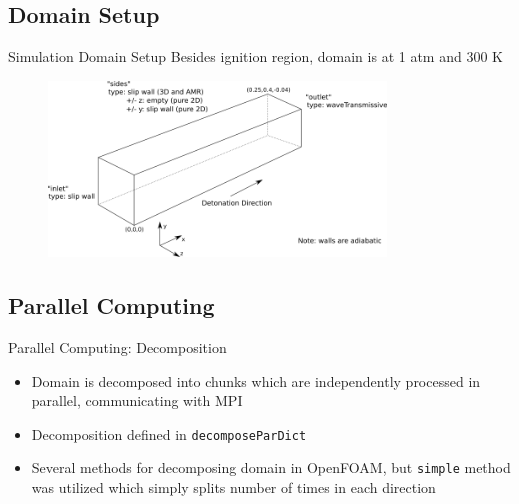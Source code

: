 \subsection{Domain Setup}

\begin{frame}{Simulation Domain Setup}
Besides ignition region, domain is at 1 atm and 300 K
\begin{figure}[t!]
\centering
\includegraphics[width=0.8\textwidth]{../figs/domainBC.png}
\end{figure}%
\end{frame}

\subsection{Parallel Computing}

\begin{frame}{Parallel Computing: Decomposition}
\begin{itemize}
\item Domain is decomposed into chunks which are independently processed in parallel, communicating with MPI \cite{walker}
\item Decomposition defined in \texttt{decomposeParDict}
\item Several methods for decomposing domain in OpenFOAM, but \texttt{simple} method was utilized which simply splits number of times in each direction
\end{itemize}
\end{frame}

